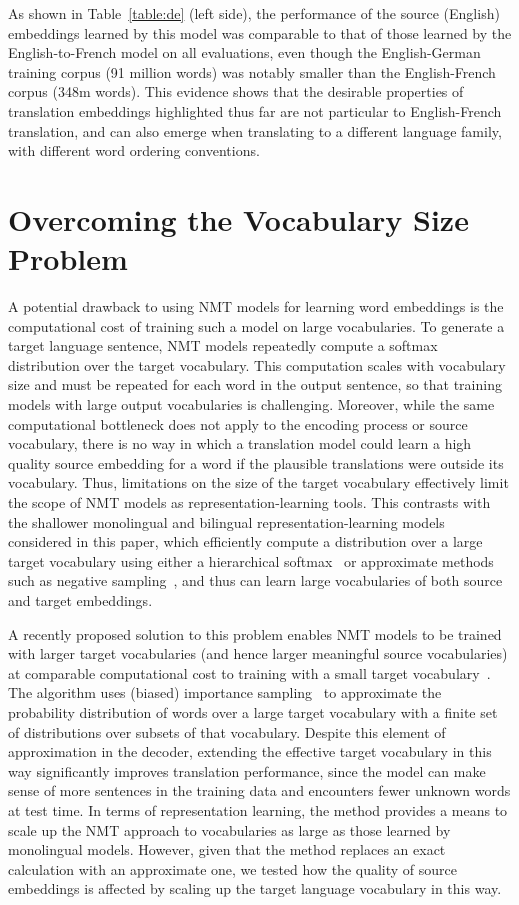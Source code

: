 As shown in Table~\ref{table:de} (left side), the performance of the source (English) embeddings learned by this model was comparable to that of those learned by the English-to-French model on all evaluations, even though the English-German training corpus (91 million words) was notably smaller than the English-French corpus (348m words). This evidence shows that the desirable properties of translation embeddings highlighted thus far are not particular to English-French translation, and can also emerge when translating to a different language family, with different word ordering conventions.     

\section{Overcoming the Vocabulary Size Problem}

A potential drawback to using NMT models for learning word embeddings is the computational cost of training such a model on large vocabularies. To generate a target language sentence, NMT models repeatedly compute a softmax distribution over the target vocabulary. This computation scales with vocabulary size and must be repeated for each word in the output sentence, so that training models with large output vocabularies is challenging. Moreover, while the same computational bottleneck does not apply to the encoding process or source vocabulary, there is no way in which a translation model could learn a high quality source embedding for a word if the plausible translations were outside its vocabulary. Thus, limitations on the size of the target vocabulary effectively limit the scope of NMT models as representation-learning tools. This contrasts with the shallower monolingual and bilingual representation-learning models considered in this paper,  which efficiently compute a distribution over a large target vocabulary using either a hierarchical softmax~\cite{morin2005hierarchical} or approximate methods such as negative sampling~\cite{mikolov2013distributed,Hermann:2014:ICLR}, and thus can learn large vocabularies of both source and target embeddings.

A recently proposed solution to this problem enables NMT models to be trained with larger target vocabularies (and hence larger meaningful source vocabularies) at comparable computational cost to training with a small target vocabulary~\cite{Jean}. The algorithm uses (biased) importance sampling~\cite{Bengio+Senecal-2003-small} to approximate the probability distribution of words over a large target vocabulary with a finite set of distributions over subsets of that vocabulary. Despite this element of approximation in the decoder, extending the effective target vocabulary in this way significantly improves translation performance, since the model can make sense of more sentences in the training data and encounters fewer unknown words at test time. In terms of representation learning, the method provides a means to scale up the NMT approach to vocabularies as large as those learned by monolingual models. However, given that the method replaces an exact calculation with an approximate one, we tested how the quality of source embeddings is affected by scaling up the target language vocabulary in this way. 

